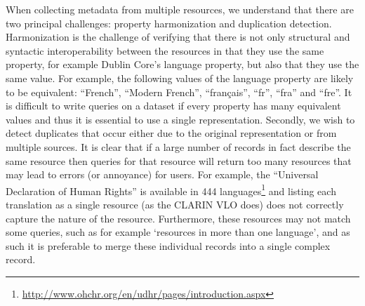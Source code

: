 \documentclass[11pt]{article}
\begin{document}
When collecting metadata from multiple resources, we understand that there are
two principal challenges: property harmonization and duplication detection. Harmonization
is the challenge of verifying that there is not only structural and syntactic 
interoperability between the resources in that they use the same property, for
example Dublin Core's language property, but also that they use the same value.
For example, the following values of the language property are likely to be
equivalent: ``French'', ``Modern French'', ``fran\c{c}ais'', ``fr'', ``fra'' and
``fre''. It is difficult to write queries on a dataset if every property has
many equivalent values and thus it is essential to use a single representation.
Secondly, we wish to detect duplicates that occur either due to the original
representation or from multiple sources. It is clear that if a large number of
records in fact describe the same resource then queries for that resource will
return too many resources that may lead to errors (or annoyance) for users. For
example, the ``Universal Declaration of Human Rights'' is available in 444
languages\footnote{\url{http://www.ohchr.org/en/udhr/pages/introduction.aspx}}
and listing each translation as a single resource (as the CLARIN VLO does) does  not correctly capture the nature of the resource. Furthermore, these resources may not match some queries, such as
for example `resources in more than one language', and as such it is preferable to
merge these individual records into a single complex record.
%
\end{document}
